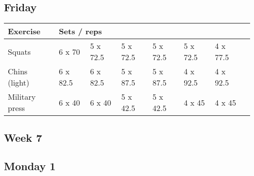 \documentclass[12pt, a4paper]{article}%
\begin{document}
  \subsection*{\hspace{0.5em} Friday }


  \begin{tabular}{l|lllllll}
  \hspace{0.75em} \textbf{Exercise} & \multicolumn{ 7 }{l}{ \textbf{Sets / reps} } \\ \hline

            \hspace{0.75em} Squats
            & 6 x 70
            & 5 x 72.5
            & 5 x 72.5
            & 5 x 72.5
            & 5 x 72.5
            & 4 x 77.5
            & 
            \\


            \hspace{0.75em} Chins (light)
            & 6 x 82.5
            & 6 x 82.5
            & 5 x 87.5
            & 5 x 87.5
            & 4 x 92.5
            & 4 x 92.5
            & 
            \\


            \hspace{0.75em} Military press
            & 6 x 40
            & 6 x 40
            & 5 x 42.5
            & 5 x 42.5
            & 4 x 45
            & 4 x 45
            & 
            \\


  \end{tabular}


\clearpage \subsection*{\hspace{0.25em} Week 7 }
  \subsection*{\hspace{0.5em} Monday 1 }
\end{document}

